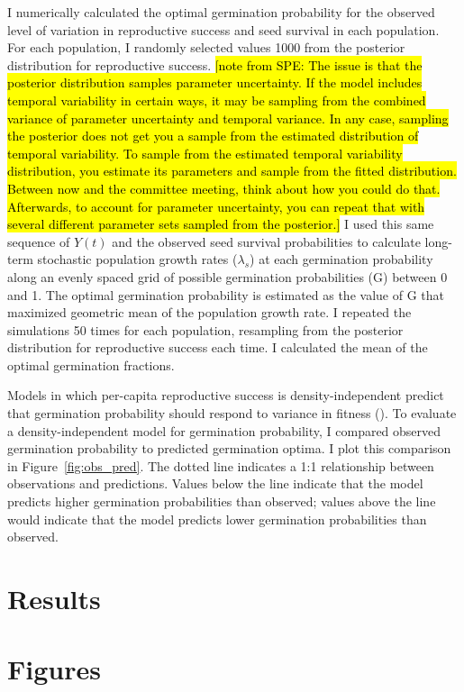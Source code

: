 \documentclass[12pt, oneside, titlepage]{article}   	%
\begin{document}
I numerically calculated the optimal germination probability for the observed level of variation in reproductive success and seed survival in each population. For each population, I randomly selected values 1000 from the posterior distribution for reproductive success. \hl{[note from SPE: The issue is that the posterior distribution samples parameter uncertainty. If the model includes temporal variability in certain ways, it may be sampling from the combined variance of parameter uncertainty and temporal variance. In any case, sampling the posterior does not get you a sample from the estimated distribution of temporal variability.
To sample from the estimated temporal variability distribution, you estimate its parameters and sample from the fitted distribution. Between now and the committee meeting, think about how you could do that. Afterwards, to account for parameter uncertainty, you can repeat that with several different parameter sets sampled from the posterior.]} I used this same sequence of $Y(t)$ and the observed seed survival probabilities to calculate long-term stochastic population growth rates ($\lambda_s$) at each germination probability along an evenly spaced grid of possible germination probabilities (G) between 0 and 1. The optimal germination probability is estimated as the value of G that maximized geometric mean of the population growth rate. I repeated the simulations 50 times for each population, resampling from the posterior distribution for reproductive success each time. I calculated the mean of the optimal germination fractions.  

Models in which per-capita reproductive success is density-independent predict that germination probability should respond to variance in fitness (\cite{cohen1966}). To evaluate a density-independent model for germination probability, I compared observed germination probability to predicted germination optima. I plot this comparison in Figure~\ref{fig:obs_pred}. The dotted line indicates a 1:1 relationship between observations and predictions. Values below the line indicate that the model predicts higher germination probabilities than observed; values above the line would indicate that the model predicts lower germination probabilities than observed.

\section*{Results}

\newpage
\section*{Figures} 
\end{document}
